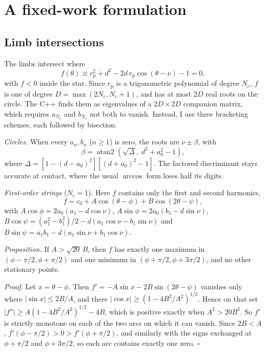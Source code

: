 \documentclass[twocolumn]{aastex701}
\begin{document}
\section{A fixed-work formulation} \label{sec:method}

\subsection{Limb intersections} \label{sec:roots}

The limbs intersect where
\begin{equation}
f(\theta) \equiv r_\mathrm{p}^2 + d^2 - 2 d\, r_\mathrm{p}
\cos(\theta-\nu) - 1 = 0,
\label{eq:f}
\end{equation}
with $f<0$ inside the star. Since $r_\mathrm{p}$ is a trigonometric
polynomial of degree $N_c$, $f$ is one of degree $D = \max(2N_c, N_c+1)$,
and has at most $2D$ real roots on the circle. The C++ finds them as
eigenvalues of a $2D\times2D$ companion matrix, which requires $a_{N_c}$
and $b_{N_c}$ not both to vanish. Instead, I use three bracketing schemes,
each followed by bisection.

\textit{Circles.} When every $a_n, b_n$ ($n\geq1$) is zero, the roots are
$\nu\pm\beta$, with
\begin{equation}
\beta = \operatorname{atan2}\!\left(\sqrt{\Delta},\; d^2 + a_0^2 - 1\right),
\end{equation}
where $\Delta = [1-(d-a_0)^2][(d+a_0)^2-1]$. The factored discriminant
stays accurate at contact, where the usual $\arccos$ form loses half its
digits.

\textit{First-order strings} ($N_c=1$). Here $f$ contains only the first
and second harmonics,
\begin{equation}
f = c_0 + A\cos(\theta-\phi) + B\cos(2\theta-\psi),
\end{equation}
with $A\cos\phi = 2a_0(a_1 - d\cos\nu)$, $A\sin\phi = 2a_0(b_1 - d\sin\nu)$,
$B\cos\psi = (a_1^2-b_1^2)/2 - d(a_1\cos\nu - b_1\sin\nu)$ and
$B\sin\psi = a_1 b_1 - d(a_1\sin\nu + b_1\cos\nu)$.

\textit{Proposition.} If $A > \sqrt{20}\,B$, then $f$ has exactly one
maximum in $(\phi-\pi/2, \phi+\pi/2)$ and one minimum in
$(\phi+\pi/2, \phi+3\pi/2)$, and no other stationary points.

\textit{Proof.} Let $x = \theta-\phi$. Then
$f' = -A\sin x - 2B\sin(2\theta-\psi)$ vanishes only where
$|\sin x| \leq 2B/A$, and there
$|\cos x| \geq (1-4B^2/A^2)^{1/2}$. Hence on that set
$|f''| \geq A(1-4B^2/A^2)^{1/2} - 4B$, which is positive exactly when
$A^2 > 20B^2$. So $f'$ is strictly monotone on each of the two arcs on
which it can vanish. Since $2B < A$, $f'(\phi-\pi/2) > 0 > f'(\phi+\pi/2)$,
and similarly with the signs exchanged at $\phi+\pi/2$ and $\phi+3\pi/2$,
so each arc contains exactly one zero. $\square$
\end{document}
